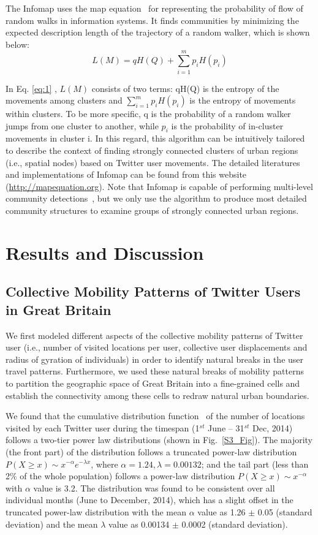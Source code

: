 \documentclass[10pt,letterpaper]{article}
\begin{document}
The Infomap uses the map equation~\cite{rosvall2010} for representing the probability of flow of random walks in information systems.
It finds communities by minimizing the expected description length of the trajectory of a random walker, which is shown below:
\begin{equation} \label{eq:1}
L(M)=qH(Q) + \sum_{i=1}^{m} p_{i}H(p_{i})
\end{equation}

In Eq. \eqref{eq:1} , $L(M)$ consists of two terms: qH(Q) is the entropy of the movements among clusters and $ \sum_{i=1}^{m} p_{i}H(p_{i})$ is the entropy of movements within clusters. 
To be more specific, q is the probability of a random walker jumps from one cluster to another, while $p_i$ is the probability of in-cluster movements in cluster i.
In this regard, this algorithm can be intuitively tailored to describe the context of finding strongly connected clusters of urban regions (i.e., spatial nodes) based on  Twitter user movements.
The detailed literatures and implementations of Infomap can be found from this website (\url{http://mapequation.org}).
Note that Infomap is capable of performing multi-level community detections~\cite{domenico2015}, but we only use the algorithm to produce most detailed community structures
to examine groups of strongly connected urban regions.

\section*{Results and Discussion}
\subsection*{Collective Mobility Patterns of Twitter Users in Great Britain}
We first modeled different aspects of the collective mobility patterns of Twitter user (i.e., number of visited locations per user,  collective user displacements and radius of gyration of individuals) in order to identify natural breaks in the user travel patterns.
Furthermore, we used these natural breaks of mobility patterns to partition the geographic space of Great Britain into a fine-grained cells and establish the connectivity among these cells to redraw natural urban boundaries. 

We found that the cumulative distribution function~\cite{clauset2009} of the number of locations visited by each Twitter user during the timespan (1$^{st}$ June – 31$^{st}$ Dec, 2014) follows a two-tier power law distributions (shown in Fig.~\ref{S3_Fig}). 
The majority (the front part) of the distribution follows a truncated power-law distribution $P(X\geq x)\sim x^{-\alpha}e^{-\lambda x}$, where $\alpha = 1.24, \lambda =0.00132$; and the tail part (less than 2$\%$ of the whole population) follows a power-law distribution  $P(X \geq x)\sim x^{-\alpha}$ with $\alpha$ value is 3.2.
The distribution was found to be consistent over all individual months (June to December, 2014), which has a slight offset in the truncated power-law distribution with the mean $\alpha$ value as 1.26 $ \pm$  0.05 (standard deviation) and the mean $\lambda$ value as 0.00134 $ \pm$  0.0002 (standard deviation). 
\end{document}
